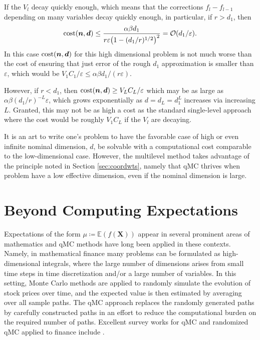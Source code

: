 \documentclass{svproc}
\begin{document}
If the $V_l$ decay quickly enough, which means that the corrections $f_l - f_{l-1}$ depending on many variables decay quickly enough, in particular, if $r > d_1$, then 
\begin{equation}
         \text{cost}({\boldsymbol{n}},{\boldsymbol{d}}) \le \frac{\alpha \beta d_1} {r \varepsilon \bigl( 1 - (d_1/r)^{1/2}\bigr)^2} = \mathcal{O}(d_1/\varepsilon).
\end{equation}
In this case $\text{cost}({\boldsymbol{n}},{\boldsymbol{d}})$ for this high dimensional problem is not much worse than the cost of ensuring that just error of the rough $d_1$ approximation is smaller than $\varepsilon$, which would be $V_1C_1/\varepsilon \le \alpha \beta d_1/(r\varepsilon)$.  

However, if $r < d_1$, then $\text{cost}({\boldsymbol{n}},{\boldsymbol{d}}) \ge V_LC_L/\varepsilon$ which may be as large as $\alpha \beta (d_1/r)^{-L}{\varepsilon}$, which grows exponentially as $d = d_L = d_1^L$ increases via increasing $L$.  Granted, this may not be as high a cost as the standard single-level approach where the cost would be roughly $V_1C_L$ if the $V_l$ are decaying.

It is an art to write one's problem to have the favorable case of high or even infinite nominal dimension, $d$, be solvable with a computational cost comparable to the low-dimensional case.  However, the multilevel method takes advantage of the principle noted in Section \ref{sec:coordwts}, namely that qMC thrives when problem have a low effective dimension, even if the nominal dimension is large.  

\section{Beyond Computing Expectations} \label{sec:beyond}

Expectations of the form $\mu \coloneqq \mathbb{E}(f(\mathbf{X}))$ appear in several prominent areas of mathematics and qMC methods have long been applied in these contexts. Namely, in mathematical finance many problems can be formulated as high-dimensional integrals, where the large number of dimensions arises from small time steps in time discretization and/or a large number of variables. In this setting, Monte Carlo methods are applied to randomly simulate the evolution of stock prices over time, and the expected value is then estimated by averaging over all sample paths. The qMC approach replaces the randomly generated paths by carefully constructed paths in an effort to reduce the computational burden on the required number of paths. Excellent survey works for qMC and randomized qMC applied to finance include \cite{CafMor96,LEc09,Lem04a,Jae02,wangsloan05}. 
\end{document}
